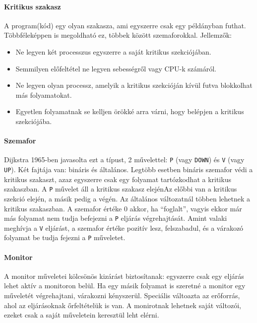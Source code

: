\documentclass[fleqn,10pt,a4paper]{article}
\theoremstyle{magyar}
\begin{document}
  \paragraph{Kritikus szakasz} A program(kód) egy olyan szakasza, ami egyszerre csak egy példányban futhat. Többféleképpen
  is megoldható ez, többek között szemaforokkal. Jellemzők:
  \begin{itemize}
  \item Ne legyen két processzus egyszerre a saját kritikus szekciójában.
  \item Semmilyen előfeltétel ne legyen sebességről vagy CPU-k számáról.
  \item Ne legyen olyan processz, amelyik a kritikus szekcióján kívül futva blokkolhat más folyamatokat.
  \item Egyetlen folyamatnak se kelljen örökké arra várni, hogy belépjen a kritikus szekciójába.
  \end{itemize}  

  \paragraph{Szemafor} Dijkstra 1965-ben javasolta ezt a típust, 2 művelettel: \texttt{P} (vagy \texttt{DOWN}) és
  \texttt{V} (vagy \texttt{UP}). Két fajtája van: bináris és általános. Legtöbb esetben bináris szemafor védi a kritikus
  szakaszt, azaz egyszerre csak egy folyamat tartózkodhat a kritikus szakaszban. A \texttt{P} művelet áll a kritikus
  szakasz elejénAz előbbi van a kritikus szekció elején, a másik pedig a végén. Az általános változatnál többen lehetnek
  a kritikus szakaszban.
  A szemafor értéke 0 akkor, ha ``foglalt'', vagyis ekkor már más folyamat nem tudja befejezni a \texttt{P} eljárás
  végrehajtását. Amint valaki meghívja a \texttt{V} eljárást, a szemafor értéke pozitív lesz, felszabadul, és a várakozó
  folyamat be tudja fejezni a \texttt{P} műveletet.
  
  \paragraph{Monitor}

  A monitor műveletei kölcsönös kizárást biztosítanak: egyszerre csak egy eljárás lehet aktív a monitoron belül. Ha egy
  másik folyamat is szeretné a monitor egy műveletét végrehajtani, várakozni kényszerül. Speciális váltoazta az
  erőforrás, ahol az eljárásoknak őrfeltételük is van. A monirotnak lehetnek saját változói, ezeket csak a saját
  műveletein keresztül leht elérni.
\end{document}
